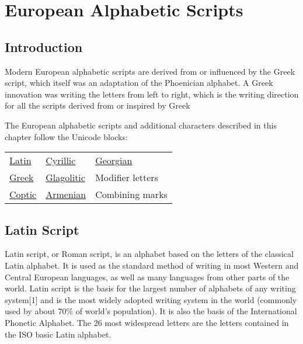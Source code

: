 
\chapter{European Alphabetic Scripts}

\section{Introduction}

Modern European alphabetic scripts are derived from or influenced by the Greek script,
which itself was an adaptation of the Phoenician alphabet. A Greek innovation was writing
the letters from left to right, which is the writing direction for all the scripts derived from or
inspired by Greek

The European alphabetic scripts and additional characters described in this chapter follow the Unicode blocks:
\medskip


\begin{center}
\begin{tabular}{lll}
\hyperref[s:latin]{Latin} 
& \hyperref[s:cyrillic]{Cyrillic} 
& \hyperref[s:georgian]{Georgian}\\
  \hyperref[s:greek]{Greek} 
& \hyperref[s:glagolitic]{Glagolitic}
&Modifier letters\\
   \hyperref[s:coptic]{Coptic} 
&  \hyperref[s:armenian]{Armenian} 
&Combining marks\\
\end{tabular}
\end{center}

\section{Latin Script}
\label{s:latin}
Latin script, or Roman script, is an alphabet based on the letters of the classical Latin alphabet. It is used as the standard method of writing in most Western and Central European languages, as well as many languages from other parts of the world. Latin script is the basis for the largest number of alphabets of any writing system[1] and is the most widely adopted writing system in the world (commonly used by about 70\% of world's population). It is also the basis of the International Phonetic Alphabet. The 26 most widespread letters are the letters contained in the ISO basic Latin alphabet.

